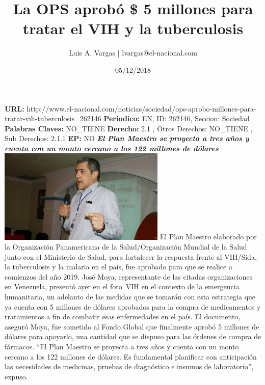 \documentclass{article}%
\title{\textbf{La OPS aprobó \$ 5 millones para tratar el VIH y la tuberculosis}}%
\author{Luis A. Vargas | lvargas@el{-}nacional.com}%
\date{05/12/2018}%
\begin{document}
%
\normalsize%
\maketitle%
\textbf{URL: }%
http://www.el{-}nacional.com/noticias/sociedad/ops{-}aprobo{-}millones{-}para{-}tratar{-}vih{-}tuberculosis\_262146\newline%
%
\textbf{Periodico: }%
EN, %
ID: %
262146, %
Seccion: %
Sociedad\newline%
%
\textbf{Palabras Claves: }%
NO\_TIENE\newline%
%
\textbf{Derecho: }%
2.1%
, Otros Derechos: %
NO\_TIENE%
, Sub Derechos: %
2.1.1%
\newline%
%
\textbf{EP: }%
NO\newline%
\newline%
%
\textbf{\textit{El Plan Maestro se proyecta a tres años y cuenta con un monto cercano a los 122 millones de dólares}}%
\newline%
\newline%
%
\includegraphics[width=300px]{114.jpg}%
\newline%
%
El Plan Maestro elaborado por la Organización Panamericana de la Salud/Organización Mundial de la Salud junto con el Ministerio de Salud, para fortalecer la respuesta frente al VIH/Sida, la tuberculosis y la malaria en el país, fue aprobado para que se realice a comienzos del año 2019. José Moya, representante de las citadas organizaciones en Venezuela, presentó ayer en el foro~VIH en el contexto de la emergencia humanitaria, un adelanto de las medidas que se tomarán con esta estrategia que ya cuenta con 5 millones de dólares aprobados para la compra de medicamentos y tratamientos a fin de combatir esas enfermedades en el país.%
\newline%
%
El documento, aseguró Moya, fue sometido al Fondo Global que finalmente aprobó 5 millones de dólares para apoyarlo, una cantidad que se dispuso para las órdenes de compra de fármacos.%
\newline%
%
“El Plan Maestro se proyecta a tres años y cuenta con un monto cercano a los 122 millones de dólares. Es fundamental planificar con anticipación las necesidades de medicinas, pruebas de diagnóstico e insumos de laboratorio”, expuso.%
\end{document}
